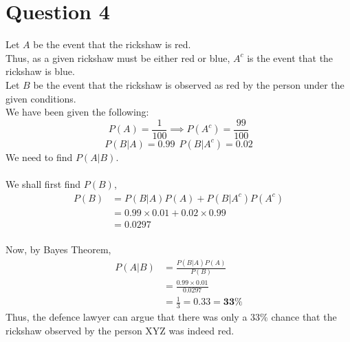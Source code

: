 \documentclass[11pt]{article}
\begin{document}
\newpage
\section*{Question 4}
Let $A$ be the event that the rickshaw is red.\\
Thus, as a given rickshaw must be either red or blue, $A^c$ is the event that the rickshaw is blue.\\
Let $B$ be the event that the rickshaw is observed as red by the person under the given conditions.\\
We have been given the following:
$$
    P(A) = \frac{1}{100} \implies P(A^c) = \frac{99}{100}
$$
$$
    P(B|A) = 0.99 \ \  P(B|A^c) = 0.02
$$
We need to find $P(A|B)$. \\
\\
We shall first find $P(B)$,
$$
    \begin{aligned}
        P(B) & = P(B|A)P(A) + P(B|A^c)P(A^c)     \\
             & = 0.99\times0.01 + 0.02\times0.99 \\
             & = 0.0297
    \end{aligned}
$$
\\
Now, by Bayes Theorem,
$$
    \begin{aligned}
        P(A|B) & = \frac{P(B|A)P(A)}{P(B)}            \\
               & = \frac{0.99\times0.01}{0.0297}      \\
               & = \frac{1}{3} = 0.33 = \mathbf{33\%}
    \end{aligned}
$$
Thus, the defence lawyer can argue that there was only a $33\%$ chance that the rickshaw observed by the person XYZ was indeed red.



\newpage
\end{document}

